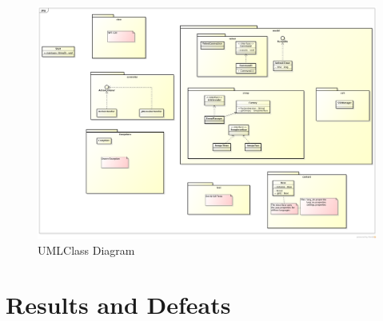 \documentclass[a4paper,12pt]{scrreprt}
\begin{document}
\begin{figure}[h!]
\centering
\caption{UMLClass Diagram}
\label{fig:RTNUmlImage}
\includegraphics[width=1.0\textwidth]{RTNUmlImage}
\end{figure}

\chapter{Results and Defeats}
\end{document}
